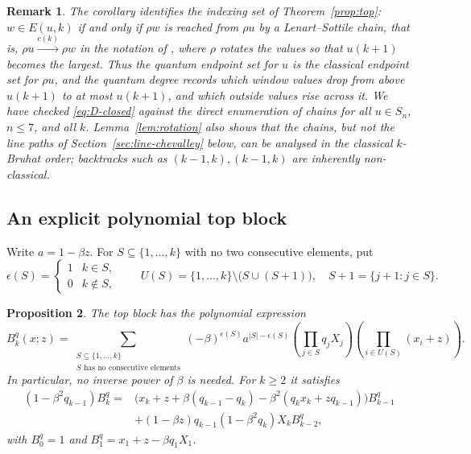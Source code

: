 \documentclass[11pt]{article}
\newtheorem{proposition}{Proposition}
\newtheorem{remark}[proposition]{Remark}
\begin{document}
\begin{remark}
The corollary identifies the indexing set of Theorem~\ref{prop:top}:
$w\in E(u,k)$ if and only if $\rho w$ is reached from $\rho u$ by a
Lenart--Sottile chain, that is, $\rho u\xrightarrow{c(k)}\rho w$ in
the notation of \cite{lenart2007pieri}, where $\rho$ rotates the
values so that $u(k+1)$ becomes the largest. Thus the quantum
endpoint set for $u$ is the classical endpoint set for $\rho u$, and
the quantum degree records which window values drop from above
$u(k+1)$ to at most $u(k+1)$, and which outside values rise across
it. We have checked \eqref{eq:D-closed} against the direct
enumeration of chains for all $u\in S_n$, $n\leq7$, and all $k$.
Lemma~\ref{lem:rotation} also shows that the chains, but not the line
paths of Section~\ref{sec:line-chevalley} below, can be analysed in
the classical $k$-Bruhat order; backtracks such as
$(k-1,k),(k-1,k)$ are inherently non-classical.
\end{remark}

\subsection{An explicit polynomial top block}

Write $a=1-\beta z$. For $S\subseteq\{1,\ldots,k\}$ with no two
consecutive elements, put
\[
 \epsilon(S)=
 \begin{cases}1&k\in S,\\0&k\notin S,\end{cases}
 \qquad
 U(S)=\{1,\ldots,k\}\setminus\bigl(S\cup(S+1)\bigr),
 \quad S+1=\{j+1:j\in S\}.
\]

\begin{proposition}\label{prop:block-polynomial}
The top block has the polynomial expression
\begin{equation}\label{eq:block-matchings}
 B_k^q(x;z)=
 \sum_{\substack{S\subseteq\{1,\ldots,k\}\\
                  S\text{ has no consecutive elements}}}
 (-\beta)^{\epsilon(S)}
 a^{|S|-\epsilon(S)}
 \left(\prod_{j\in S}q_jX_j\right)
 \left(\prod_{i\in U(S)}(x_i+z)\right).
\end{equation}
In particular, no inverse power of $\beta$ is needed.
For $k\geq2$ it satisfies
\begin{equation}\label{eq:block-recurrence}
\begin{split}
 (1-\beta^2q_{k-1})B_k^q
 ={}&
 \bigl(x_k+z+\beta(q_{k-1}-q_k)
       -\beta^2(q_kx_k+zq_{k-1})\bigr)B_{k-1}^q\\
 &+(1-\beta z)q_{k-1}(1-\beta^2q_k)X_k B_{k-2}^q,
\end{split}
\end{equation}
with $B_0^q=1$ and
$B_1^q=x_1+z-\beta q_1X_1$.
\end{proposition}
\end{document}
